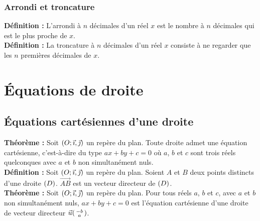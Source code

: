 \documentclass[a4paper,titlepage]{article}
\let\oldsection\section
\renewcommand\section{\clearpage\oldsection}
\let\oldleft\left
\renewcommand{\left}{\mathopen{}\mathclose\bgroup\oldleft}
\let\oldright\right
\renewcommand{\right}{\aftergroup\egroup\oldright}
\begin{document}
        \subsubsection{Arrondi et troncature}
            \textbf{Définition :} L’arrondi à $n$ décimales d’un réel $x$ est le nombre à $n$ décimales qui est le plus proche de $x$.
            \\
            \textbf{Définition :} La troncature à $n$ décimales d’un réel $x$ consiste à ne regarder que les $n$ premières décimales de $x$.
\section{Équations de droite}
    \subsection{Équations cartésiennes d’une droite}
        \textbf{Théorème :} Soit $\left(O;\vec{\imath},\vec{\jmath}\right)$ un repère du plan. Toute droite admet une équation cartésienne, c’est-à-dire du type $ax+by+c=0$ où $a$, $b$ et $c$ sont trois réels quelconques avec $a$ et $b$ non simultanément nuls.
        \\
        \textbf{Définition :} Soit $\left(O;\vec{\imath},\vec{\jmath}\right)$ un repère du plan. Soient $A$ et $B$ deux points distincts d’une droite $\left(D\right)$. $\overrightarrow{AB}$ est un vecteur directeur de $\left(D\right)$.
        \\
        \textbf{Théorème :} Soit $\left(O;\vec{\imath},\vec{\jmath}\right)$ un repère du plan. Pour tous réels $a$, $b$ et $c$, avec $a$ et $b$ non simultanément nuls, $ax+by+c=0$ est l’équation cartésienne d’une droite de vecteur directeur $\vec{u}\left(\begin{smallmatrix}-b\\a\end{smallmatrix}\right)$.
\end{document}
